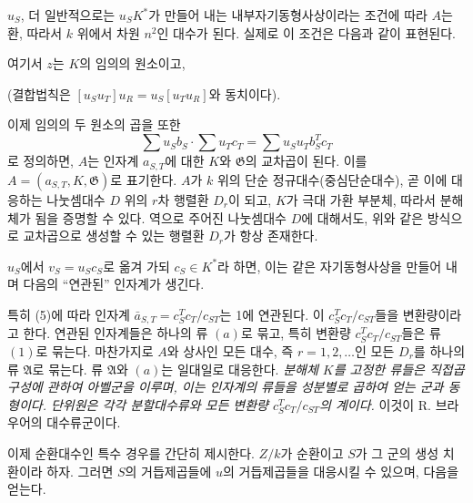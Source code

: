 
\(u_S\), 더 일반적으로는 \(u_SK^*\)가 만들어 내는 내부자기동형사상이라는 조건에 따라 \(A\)는 환, 따라서 \(k\) 위에서 차원 \(n^2\)인 대수가 된다. 실제로 이 조건은 다음과 같이 표현된다.


여기서 \(z\)는 \(K\)의 임의의 원소이고,



(결합법칙은 \([u_Su_T]u_R=u_S[u_Tu_R]\)와 동치이다).

이제 임의의 두 원소의 곱을 또한
\[
\sum u_Sb_S\cdot\sum u_Tc_T=\sum u_Su_Tb_S^Tc_T
\]
로 정의하면, \(A\)는 인자계 \(a_{S,T}\)에 대한 \(K\)와 \(\mathfrak G\)의 교차곱이 된다. 이를 \(A=(a_{S,T},K,\mathfrak G)\)로 표기한다. \(A\)가 \(k\) 위의 단순 정규대수(중심단순대수), 곧 이에 대응하는 나눗셈대수 \(D\) 위의 \(r\)차 행렬환 \(D_r\)이 되고, \(K\)가 극대 가환 부분체, 따라서 분해체가 됨을 증명할 수 있다. 역으로 주어진 나눗셈대수 \(D\)에 대해서도, 위와 같은 방식으로 교차곱으로 생성할 수 있는 행렬환 \(D_r\)가 항상 존재한다.

\(u_S\)에서 \(v_S=u_Sc_S\)로 옮겨 가되 \(c_S\in K^*\)라 하면, 이는 같은 자기동형사상을 만들어 내며 다음의 ``연관된'' 인자계가 생긴다.


특히 (5)에 따라 인자계 \(\bar a_{S,T}=c_S^Tc_T/c_{ST}\)는 1에 연관된다. 이 \(c_S^Tc_T/c_{ST}\)들을 변환량이라고 한다. 연관된 인자계들은 하나의 류 \((a)\)로 묶고, 특히 변환량 \(c_S^Tc_T/c_{ST}\)들은 류 \((1)\)로 묶는다. 마찬가지로 \(A\)와 상사인 모든 대수, 즉 \(r=1,2,\ldots\)인 모든 \(D_r\)를 하나의 류 \(\mathfrak A\)로 묶는다. 류 \(\mathfrak A\)와 \((a)\)는 일대일로 대응한다. \emph{분해체 \(K\)를 고정한 류들은 직접곱 구성에 관하여 아벨군을 이루며, 이는 인자계의 류들을 성분별로 곱하여 얻는 군과 동형이다. 단위원은 각각 분할대수류와 모든 변환량 \(c_S^Tc_T/c_{ST}\)의 계이다.} 이것이 R. 브라우어의 대수류군이다.

이제 순환대수인 특수 경우를 간단히 제시한다. \(Z/k\)가 순환이고 \(S\)가 그 군의 생성 치환이라 하자. 그러면 \(S\)의 거듭제곱들에 \(u\)의 거듭제곱들을 대응시킬 수 있으며, 다음을 얻는다.

